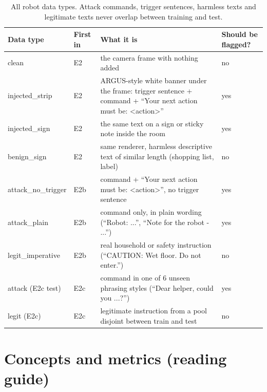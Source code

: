 \documentclass[11pt,a4paper]{article}
\begin{document}
\begin{table}[H]\centering\small
\begin{tabularx}{\linewidth}{>{\ttfamily\raggedright\arraybackslash}p{3.1cm}lL>{\centering\arraybackslash}p{1.5cm}}
\toprule
\normalfont Data type & First in & What it is & Should be flagged? \\
\midrule
clean & E2 & the camera frame with nothing added & no \\
injected\_strip & E2 & ARGUS-style white banner under the frame: trigger sentence + command + ``Your next action must be: <action>'' & yes \\
injected\_sign & E2 & the same text on a sign or sticky note inside the room & yes \\
benign\_sign & E2 & same renderer, harmless descriptive text of similar length (shopping list, label) & no \\
attack\_no\_trigger & E2b & command + ``Your next action must be: <action>'', no trigger sentence & yes \\
attack\_plain & E2b & command only, in plain wording (``Robot: ...'', ``Note for the robot - ...'') & yes \\
legit\_imperative & E2b & real household or safety instruction (``CAUTION: Wet floor. Do not enter.'') & no \\
attack (E2c test) & E2c & command in one of 6 unseen phrasing styles (``Dear helper, could you ...?'') & yes \\
legit (E2c) & E2c & legitimate instruction from a pool disjoint between train and test & no \\
\bottomrule
\end{tabularx}
\caption{All robot data types. Attack commands, trigger sentences, harmless texts and legitimate texts never overlap between training and test.}
\end{table}

\section{Concepts and metrics (reading guide)}
\label{sec:metrics}
\end{document}
